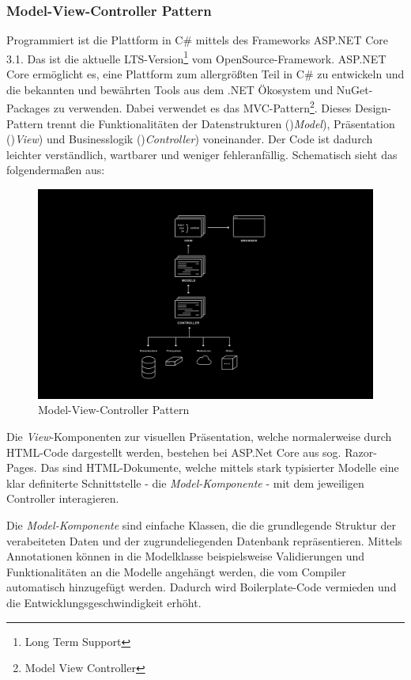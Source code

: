\documentclass[titlepage, a4paper, 11pt]{scrartcl}
\begin{document}
      \subsubsection{Model-View-Controller Pattern}

        Programmiert ist die Plattform in C\# mittels des Frameworks ASP.NET Core 3.1. Das ist die aktuelle LTS-Version\footnote{Long Term Support} vom OpenSource-Framework.
        ASP.NET Core ermöglicht es, eine Plattform zum allergrößten Teil in C\# zu entwickeln und die bekannten und bewährten Tools aus dem .NET Ökosystem und NuGet-Packages zu verwenden.
        Dabei verwendet es das MVC-Pattern\footnote{Model View Controller}. Dieses Design-Pattern trennt die Funktionalitäten der Datenstrukturen ()\textit{Model}), Präsentation ()\textit{View})
        und Businesslogik ()\textit{Controller}) voneinander. Der Code ist dadurch leichter verständlich, wartbarer und weniger fehleranfällig. Schematisch sieht das folgendermaßen aus:

        \begin{figure}[H]
          \centering
          \includegraphics[width=.8\textwidth]{MVC.png}
          \caption{Model-View-Controller Pattern}
          \label{MVC}
        \end{figure}
        
        Die \textit{View}-Komponenten zur visuellen Präsentation, welche normalerweise durch HTML-Code dargestellt werden, bestehen bei ASP.Net Core aus sog. Razor-Pages.
        Das sind HTML-Dokumente, welche mittels stark typisierter Modelle eine klar definiterte Schnittstelle - die \textit{Model-Komponente} - mit dem jeweiligen Controller interagieren.

        Die \textit{Model-Komponente} sind einfache Klassen, die die grundlegende Struktur der verabeiteten Daten und der zugrundeliegenden Datenbank repräsentieren.
        Mittels Annotationen können in die Modelklasse beispielsweise Validierungen und Funktionalitäten an die Modelle angehängt werden, die vom Compiler automatisch hinzugefügt werden.
        Dadurch wird Boilerplate-Code vermieden und die Entwicklungsgeschwindigkeit erhöht.
\end{document}

